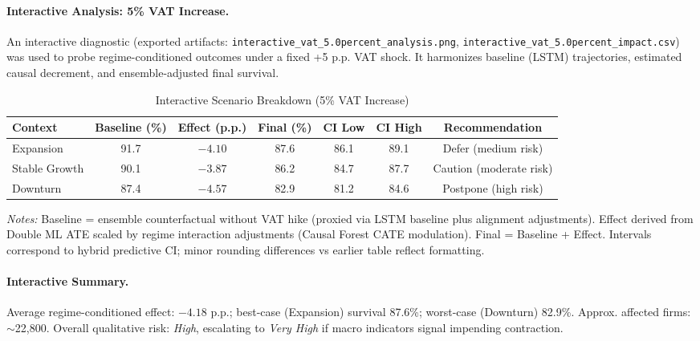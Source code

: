 \paragraph{Interactive Analysis: 5\% VAT Increase.} An interactive diagnostic (exported artifacts: \texttt{interactive\_vat\_5.0percent\_analysis.png}, \texttt{interactive\_vat\_5.0percent\_impact.csv}) was used to probe regime-conditioned outcomes under a fixed +5 p.p. VAT shock. It harmonizes baseline (LSTM) trajectories, estimated causal decrement, and ensemble-adjusted final survival.

\begin{table}[htbp]
\centering
\small
\caption{Interactive Scenario Breakdown (5\% VAT Increase)}
\label{tab:interactive_vat_5pct}
\setlength{\tabcolsep}{4pt}
\renewcommand{\arraystretch}{1.08}
\begin{tabular}{l c c c c c c}
Context & Baseline (\%) & Effect (p.p.) & Final (\%) & CI Low & CI High & Recommendation \\
\midrule
Expansion & 91.7 & $-4.10$ & 87.6 & 86.1 & 89.1 & Defer (medium risk) \\
Stable Growth & 90.1 & $-3.87$ & 86.2 & 84.7 & 87.7 & Caution (moderate risk) \\
Downturn & 87.4 & $-4.57$ & 82.9 & 81.2 & 84.6 & Postpone (high risk) \\
\bottomrule
\end{tabular}
\vspace{2mm}
\footnotesize \textit{Notes:} Baseline = ensemble counterfactual without VAT hike (proxied via LSTM baseline plus alignment adjustments). Effect derived from Double ML ATE scaled by regime interaction adjustments (Causal Forest CATE modulation). Final = Baseline + Effect. Intervals correspond to hybrid predictive CI; minor rounding differences vs earlier table reflect formatting.
\end{table}


\paragraph{Interactive Summary.} Average regime-conditioned effect: $-4.18$ p.p.; best-case (Expansion) survival 87.6\%; worst-case (Downturn) 82.9\%. Approx. affected firms: $\sim$22,800. Overall qualitative risk: \emph{High}, escalating to \emph{Very High} if macro indicators signal impending contraction.

